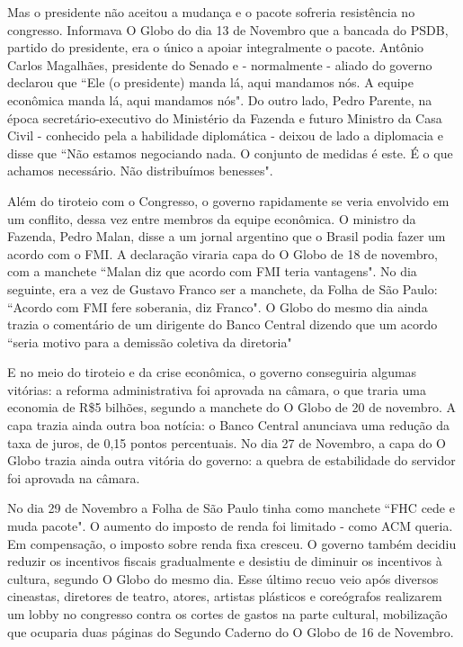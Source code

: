 \documentclass{article}
\begin{document}
Mas o presidente não aceitou a mudança e o pacote sofreria resistência no congresso. Informava O Globo do dia 13 de Novembro que a bancada do PSDB, partido do presidente, era o único a apoiar integralmente o pacote. Antônio Carlos Magalhães, presidente do Senado e - normalmente - aliado do governo declarou que ``Ele (o presidente) manda lá, aqui mandamos nós. A equipe econômica manda lá, aqui mandamos nós". Do outro lado, Pedro Parente, na época secretário-executivo do Ministério da Fazenda e futuro Ministro da Casa Civil - conhecido pela a habilidade diplomática - deixou de lado a diplomacia e disse que ``Não estamos negociando nada. O conjunto de medidas é este. É o que achamos necessário. Não distribuímos benesses".

Além do tiroteio com o Congresso, o governo rapidamente se veria envolvido em um conflito, dessa vez entre membros da equipe econômica. O ministro da Fazenda, Pedro Malan, disse a um jornal argentino que o Brasil podia fazer um acordo com o FMI. A declaração viraria capa do O Globo de 18 de novembro, com a manchete ``Malan diz que acordo com FMI teria vantagens". No dia seguinte, era a vez de Gustavo Franco ser a manchete, da Folha de São Paulo: ``Acordo com FMI fere soberania, diz Franco". O Globo do mesmo dia ainda trazia o comentário de um dirigente do Banco Central dizendo que um acordo ``seria motivo para a demissão coletiva da diretoria"   

E no meio do tiroteio e da crise econômica, o governo conseguiria algumas vitórias: a reforma administrativa foi aprovada na câmara, o que traria uma economia de R\$5 bilhões, segundo a manchete do O Globo de 20 de novembro. A capa trazia ainda outra boa notícia: o Banco Central anunciava uma redução da taxa de juros, de 0,15 pontos percentuais. No dia 27 de Novembro, a capa do O Globo trazia ainda outra vitória do governo: a quebra de estabilidade do servidor foi aprovada na câmara.

No dia 29 de Novembro a Folha de São Paulo tinha como manchete ``FHC cede e muda pacote". O aumento do imposto de renda foi limitado - como ACM queria. Em compensação, o imposto sobre renda fixa cresceu. O governo também decidiu reduzir os incentivos fiscais gradualmente e desistiu de diminuir os incentivos à cultura, segundo O Globo do mesmo dia. Esse último recuo veio após diversos cineastas, diretores de teatro, atores, artistas plásticos e coreógrafos realizarem um lobby no congresso contra os cortes de gastos na parte cultural, mobilização que ocuparia duas páginas do Segundo Caderno do O Globo de 16 de Novembro. 
\end{document}
